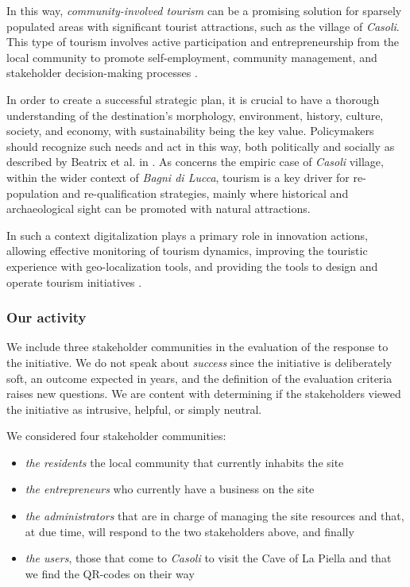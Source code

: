 \documentclass[sustainability,article,submit,pdftex,moreauthors]{Definitions/mdpi}
\begin{document}
In this way, \textit{community-involved tourism} can be a promising solution for sparsely populated areas with significant tourist attractions, such as the village of \emph{Casoli}. This type of tourism involves active participation and entrepreneurship from the local community to promote self-employment, community management, and stakeholder decision-making processes \cite{nag15}.

In order to create a successful strategic plan, it is crucial to have a thorough understanding of the destination's morphology, environment, history, culture, society, and economy, with sustainability being the key value.
Policymakers should recognize such needs and act in this way, both politically and socially as described by Beatrix et al. in \cite{bea10}. As concerns the empiric case of \emph{Casoli} village, within the wider context of \emph{Bagni di Lucca}, tourism is a key driver for re-population and re-qualification strategies, mainly where historical and archaeological sight can be promoted with natural attractions.

In such a context digitalization plays a primary role in innovation actions, allowing effective monitoring of tourism dynamics, improving the touristic experience with geo-localization tools, and providing the tools to design and operate tourism initiatives \cite{lem22}.

\subsubsection{Our activity}

We include three stakeholder communities in the evaluation of the response to the initiative. We do not speak about {\em success} since the initiative is deliberately soft, an outcome expected in years, and the definition of the evaluation criteria raises new questions. We are content with determining if the stakeholders viewed the initiative as intrusive, helpful, or simply neutral.

We considered four stakeholder communities:

\begin{itemize}
	\item {\em the residents} the local community that currently inhabits the site
	\item {\em the entrepreneurs} who currently have a business on the site
	\item {\em the administrators} that are in charge of managing the site resources and that, at due time, will respond to the two stakeholders above, and finally
	\item {\em the users}, those that come to \emph{Casoli} to visit the Cave of La Piella and that we find the QR-codes on their way
\end{itemize}
\end{document}
